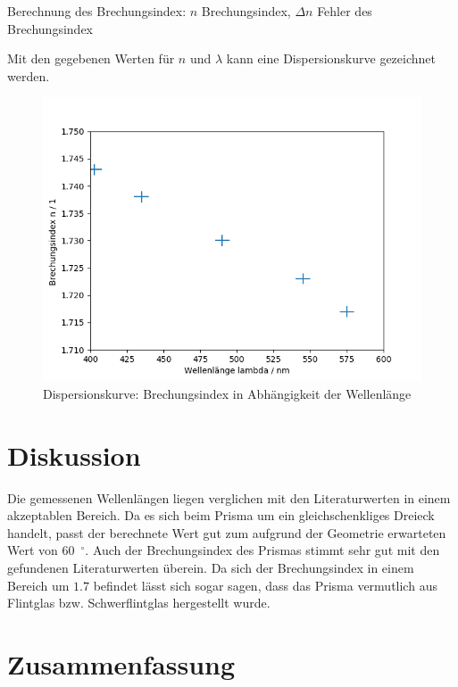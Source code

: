 \documentclass{article}
\begin{document}
\begin{table}[H]
\caption{Berechnung des Brechungsindex: $n$ Brechungsindex, $\Delta n$ Fehler des Brechungsindex}
\label{tab:prisma_brechung}
\centering

\end{table}


Mit den gegebenen Werten für $n$ und $\lambda$ kann eine Dispersionskurve gezeichnet werden.
\begin{figure}[H]
\label{fig:dispersion}
\includegraphics[scale=0.7]{kurve.png}
\caption{Dispersionskurve: Brechungsindex in Abhängigkeit der Wellenlänge}
\end{figure}

\section{Diskussion}

Die gemessenen Wellenlängen liegen verglichen mit den Literaturwerten \cite{other} in einem akzeptablen Bereich.
Da es sich beim Prisma um ein gleichschenkliges Dreieck handelt, passt der berechnete Wert gut zum aufgrund der Geometrie erwarteten Wert von 60~${}^\circ$.
Auch der Brechungsindex des Prismas stimmt sehr gut mit den gefundenen Literaturwerten \cite{wiki} überein. Da sich der Brechungsindex in einem Bereich um $1.7$ befindet lässt sich sogar sagen, dass das Prisma vermutlich aus Flintglas bzw. Schwerflintglas hergestellt wurde.




\section{Zusammenfassung}
\end{document}

